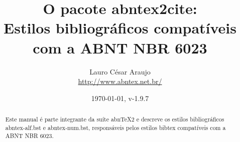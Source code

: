\documentclass[a4paper]{ltxdoc}
\begin{document}
\nocite{cesar1994,azevedo1994,batista1992,chueire1994}
\nocite{duran1993,chemello1993}
\nocite{arbex1993,carvalho1994,miglori1993,amaral1994,rodrigues1994}
\nocite{carruth1993,saadi1994,mandino1994}
\nocite{makau1962,lion1981}
\nocite{morgado1990,araujo1986}
\nocite{morgadob1990}
\nocite{morgadoc1990}
\nocite{laurenti1978,marins1991,malagrino1985,zilberman1998,holanda1994,pelosi1993,tringali1994,delosmar1997,resprinb1997,cardim1984}
\nocite{cretella1992,boletime1965}
\nocite{freyre1943,freyre1936}
\nocite{freyreg1936,freyre1938}
\nocite{DOI}
\nocite{hamada2008}

\nocite{ABNT-final}

\newcommand{\titulo}{\textbf{O pacote \textsf{abntex2cite}}:\\
\Large{Estilos bibliográficos compatíveis com a ABNT NBR 6023}}
\newcommand{\abnTeX}{abn\TeX}
\newcommand{\abnTeXSite}{\url{http://www.abntex.net.br/}}
\newcommand{\optiondefaultval}[1]{\underline{\texttt{#1}}}

\title{\titulo}
\author{Lauro César Araujo\\\abnTeXSite}
\date{\today, v-1.9.7}


% 

\maketitle

\begin{abstract}
Este manual é parte integrante da suíte \abnTeX2 e descreve os estilos
bibliográficos \textsf{abntex-alf.bst} e \textsf{abntex-num.bst}, responsáveis
pelos estilos \textsf{bibtex} compatíveis com a ABNT NBR 6023.
\end{abstract}
\end{document}

